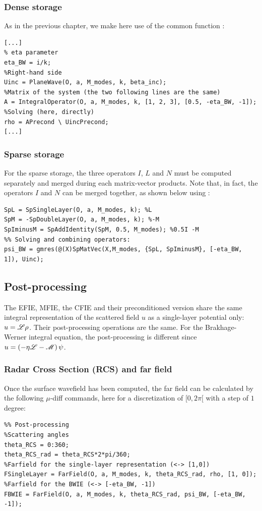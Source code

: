\subsubsection{Dense storage}

As in the previous chapter, we make here use of the common function \IntegralOperator:
\begin{lstlisting}
[...]
% eta parameter
eta_BW = i/k;
%Right-hand side
Uinc = PlaneWave(O, a, M_modes, k, beta_inc);
%Matrix of the system (the two following lines are the same)
A = IntegralOperator(O, a, M_modes, k, [1, 2, 3], [0.5, -eta_BW, -1]);
%Solving (here, directly)
rho = APrecond \ UincPrecond;
[...]
\end{lstlisting}
\medskip

\subsubsection{Sparse storage}

For the sparse storage, the three operators $I$, $L$ and $N$ must be computed separately and merged during each matrix-vector products. Note that, in fact, the operators $I$ and $N$ can be merged together, as shown below using \SpAddIdentity:
\begin{lstlisting}
SpL = SpSingleLayer(O, a, M_modes, k); %L
SpM = -SpDoubleLayer(O, a, M_modes, k); %-M
SpIminusM = SpAddIdentity(SpM, 0.5, M_modes); %0.5I -M
%% Solving and combining operators:
psi_BW = gmres(@(X)SpMatVec(X,M_modes, {SpL, SpIminusM}, [-eta_BW, 1]), Uinc);
\end{lstlisting}
\medskip

\subsection{Post-processing}

The EFIE, MFIE, the CFIE and their preconditioned version share the same integral representation of the scattered field $u$ as a single-layer potential only: $u = {\mathscr L}\rho$. Their post-processing operations are the same. For the Brakhage-Werner integral equation, the post-processing is different since $u = \left(-\eta{\mathscr L} - {\mathscr M}\right)\psi$.

\subsubsection{Radar Cross Section (RCS) and far field}

Once the surface wavefield has been computed, the far field can be calculated by the following $\mu$-diff  commands, here for a discretization of $[0,2\pi[$ with a step of $1$ degree:
\begin{lstlisting}
%% Post-processing
%Scattering angles 
theta_RCS = 0:360;
theta_RCS_rad = theta_RCS*2*pi/360;
%Farfield for the single-layer representation (<-> [1,0])
FSingleLayer = FarField(O, a, M_modes, k, theta_RCS_rad, rho, [1, 0]);
%Farfield for the BWIE (<-> [-eta_BW, -1])
FBWIE = FarField(O, a, M_modes, k, theta_RCS_rad, psi_BW, [-eta_BW, -1]);

\end{lstlisting}

